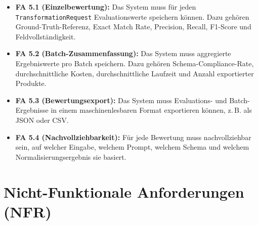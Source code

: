\documentclass[11pt,a4paper]{article}
\begin{document}
\begin{itemize}[leftmargin=*]
    \item \textbf{FA 5.1 (Einzelbewertung):} Das System muss für jeden \texttt{TransformationRequest} Evaluationswerte speichern können. Dazu gehören Ground-Truth-Referenz, Exact Match Rate, Precision, Recall, F1-Score und Feldvollständigkeit.
    
    \item \textbf{FA 5.2 (Batch-Zusammenfassung):} Das System muss aggregierte Ergebniswerte pro Batch speichern. Dazu gehören Schema-Compliance-Rate, durchschnittliche Kosten, durchschnittliche Laufzeit und Anzahl exportierter Produkte.
    
    \item \textbf{FA 5.3 (Bewertungsexport):} Das System muss Evaluations- und Batch-Ergebnisse in einem maschinenlesbaren Format exportieren können, z.\,B. als JSON oder CSV.
    
    \item \textbf{FA 5.4 (Nachvollziehbarkeit):} Für jede Bewertung muss nachvollziehbar sein, auf welcher Eingabe, welchem Prompt, welchem Schema und welchem Normalisierungsergebnis sie basiert.
\end{itemize}

\section{Nicht-Funktionale Anforderungen (NFR)}
\end{document}

